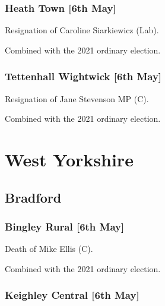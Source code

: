 \documentclass[a4paper,openany]{book}
\begin{document}
\begin{resultsiii}
\subsubsection*{Heath Town \hspace*{\fill}\nolinebreak[1]%
	\enspace\hspace*{\fill}
	[6th May]}


Resignation of Caroline Siarkiewicz (Lab).

Combined with the 2021 ordinary election.

\subsubsection*{Tettenhall Wightwick \hspace*{\fill}\nolinebreak[1]%
	\enspace\hspace*{\fill}
	[6th May]}


Resignation of Jane Stevenson MP (C).

Combined with the 2021 ordinary election.

\section{West Yorkshire}

\subsection*{Bradford}

\subsubsection*{Bingley Rural \hspace*{\fill}\nolinebreak[1]%
	\enspace\hspace*{\fill}
	[6th May]}


Death of Mike Ellis (C).

Combined with the 2021 ordinary election.

\subsubsection*{Keighley Central \hspace*{\fill}\nolinebreak[1]%
	\enspace\hspace*{\fill}
	[6th May]}


\end{resultsiii}
\end{document}
